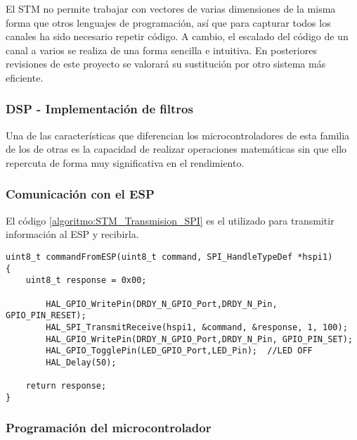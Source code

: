 El STM no permite trabajar con vectores de varias dimensiones de la misma forma que otros lenguajes de programación, así que para capturar todos los canales ha sido necesario repetir código. A cambio, el escalado del código de un canal a varios se realiza de una forma sencilla e intuitiva. En posteriores revisiones de este proyecto se valorará su sustitución por otro sistema más eficiente.

\subsubsection{DSP - Implementación de filtros \label{sec:Software_micro_DSP}}

Una de las características que diferencian los microcontroladores de esta familia de los de otras es la capacidad de realizar operaciones matemáticas sin que ello repercuta de forma muy significativa en el rendimiento. 

\subsubsection{Comunicación con el ESP \label{sec:Software_micro_ESP}}

El código \ref{algoritmo:STM_Transmision_SPI} es el utilizado para transmitir información al ESP y recibirla.

\begin{lstlisting}[label=algoritmo:STM_Transmision_SPI,style = STM-code,frame=single,caption=Transmisión de datos a través de SPI con el STM]
uint8_t commandFromESP(uint8_t command, SPI_HandleTypeDef *hspi1)
{
	uint8_t response = 0x00;	

		HAL_GPIO_WritePin(DRDY_N_GPIO_Port,DRDY_N_Pin, GPIO_PIN_RESET);
		HAL_SPI_TransmitReceive(hspi1, &command, &response, 1, 100);
		HAL_GPIO_WritePin(DRDY_N_GPIO_Port,DRDY_N_Pin, GPIO_PIN_SET);
		HAL_GPIO_TogglePin(LED_GPIO_Port,LED_Pin); 	//LED OFF
		HAL_Delay(50);
	
	return response;
}
\end{lstlisting}

\subsubsection{Programación del microcontrolador\label{sec:Software_micro_ESP}}

%		
%
